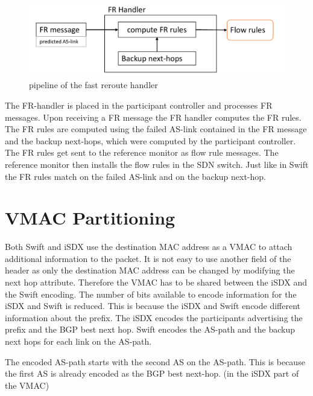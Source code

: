 \begin{figure}[h]
\center
\includegraphics[scale = 0.6]{Figures/design_fr_handler_cropped.pdf}
\caption{pipeline of the fast reroute handler}
\end{figure}

The FR-handler is placed in the participant controller and processes FR messages.
Upon receiving a FR message the FR handler computes the FR rules. The FR rules are computed using the failed AS-link contained in the FR message and the backup next-hops, which were computed by the participant controller. 
The FR rules get sent to the reference monitor as flow rule messages. The reference monitor then installs the flow rules in the SDN switch. Just like in Swift the FR rules match on the failed AS-link and on the backup next-hop.    

\newpage

\section{\label{chapter4:vmac_partitioning}VMAC Partitioning}

Both Swift and iSDX use the destination MAC address as a VMAC to attach additional information to the packet. It is not easy to use another field of the header as only the destination MAC address can be changed by modifying the next hop attribute. Therefore the VMAC has to be shared between the iSDX and the Swift encoding. The number of bits available to encode information for the iSDX and Swift is reduced. This is because the iSDX and Swift encode 
different information about the prefix. The iSDX encodes the participants advertising the prefix and the BGP best next hop. Swift encodes the AS-path and the backup next hops for each link on the AS-path.

The encoded AS-path starts with the second AS on the AS-path. This is because the first AS is already encoded as the BGP best next-hop. (in the iSDX part of the VMAC)

